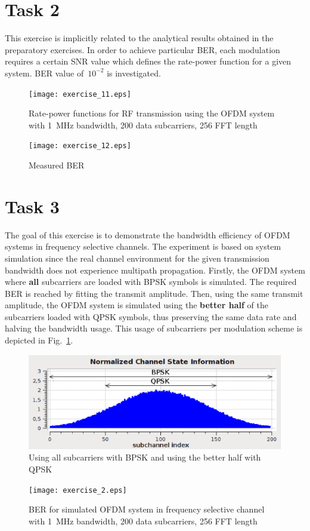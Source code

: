 \documentclass[a4paper,10pt]{paper}
\begin{document}


\section{Task 2}
This exercise is implicitly related to the analytical results obtained in the preparatory exercises. In order to achieve particular BER, each modulation requires a certain SNR value which defines the rate-power function for a given system. BER value of~$10^{-2}$ is investigated.
\begin{figure}[h]
\centering
\texttt{[image: exercise\_11.eps]}
\caption{Rate-power functions for RF transmission using the OFDM system with 1~MHz bandwidth, 200 data subcarriers, 256 FFT length}
\end{figure}
\begin{figure}[h]
\centering
\texttt{[image: exercise\_12.eps]}
\caption{Measured BER}
\end{figure}

\newpage
\section{Task 3}
The goal of this exercise is to demonstrate the bandwidth efficiency of OFDM systems in frequency selective channels. The experiment is based on system simulation since the real channel environment for the given transmission bandwidth does not experience multipath propagation. Firstly, the OFDM system where \textbf{all} subcarriers are loaded with BPSK symbols is simulated. The required BER is reached by fitting the transmit amplitude. Then, using the same transmit amplitude, the OFDM system is simulated using the \textbf{better half} of the subcarriers loaded with QPSK symbols, thus preserving the same data rate and halving the bandwidth usage. This usage of subcarriers per modulation scheme is depicted in Fig.~\ref{fig:FSC}.
\begin{figure}[thb]
\centering
\includegraphics[width=.95\linewidth]{csi.eps}
\caption{Using all subcarriers with BPSK and using the better half with QPSK}\label{fig:FSC}
\end{figure}
\begin{figure}[thb]
\centering
\texttt{[image: exercise\_2.eps]}
\caption{BER for simulated OFDM system in frequency selective channel with 1~MHz bandwidth, 200 data subcarriers, 256 FFT length}
\end{figure}
\end{document}
